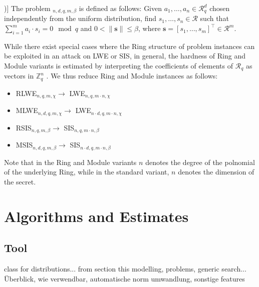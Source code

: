 \documentclass[
  a4paper,  %
  twoside,  %
  bibliography=totoc,
  headsepline,
  cleardoublepage=empty,
  parskip=half,
  draft=false
]{scrbook}
\begin{document}
\begin{definition}[Module-SIS Problem [\citealp{LS15}, Definition 3.3])]
  The problem $_{n, d, q, m, \beta}$ is defined as follows: Given $a_1, \ldots, a_n \in \mathcal{R}_q^d$ chosen independently from the uniform distribution, find $s_1, \ldots, s_n \in \mathcal{R}$ such that $\sum_{i=1}^m a_i \cdot s_i = 0\mod q$ and $0 < \| \mathbf{s}\| \leq \beta$, where $\mathbf{s} = \left[s_1, \ldots, s_m\right]^\intercal \in \mathcal{R}^m$.
\end{definition} %


While there exist special cases where the Ring structure of problem instances can be exploited in an attack on LWE or SIS, %
in general, the hardness of Ring and Module variants is estimated by interpreting the coefficients of elements of $\mathcal{R}_q$ as vectors in $\mathbb{Z}_q^n$ \cite{ACDDPPVW18}.
We thus reduce Ring and Module instances as follows:
\begin{itemize}
  \item RLWE$_{n, q, m, \chi} \longrightarrow$ LWE$_{n, q, m \cdot n, \chi}$
  \item MLWE$_{n, d, q, m, \chi} \longrightarrow$ LWE$_{n \cdot d, q, m \cdot n, \chi}$
  \item RSIS$_{n, q, m, \beta} \longrightarrow$ SIS$_{n, q, m \cdot n, \beta}$
  \item MSIS$_{n, d, q, m, \beta} \longrightarrow$ SIS$_{n \cdot d, q, m \cdot n, \beta}$
\end{itemize}
Note that in the Ring and Module variants $n$ denotes the degree of the polnomial of the underlying Ring, %
while in the standard variant, $n$ denotes the dimension of the secret. 
  
  







\chapter{Algorithms and Estimates}



\section{Tool}
class for distributions... from section this modelling, problems, generic search... Überblick, wie verwendbar,
automatische norm umwandlung,
sonstige features
\end{document}
